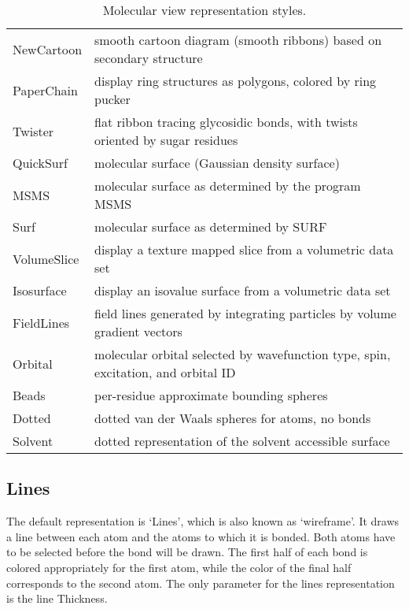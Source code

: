 \begin{table}[htb]
\begin{tabular}{|l|l|}
  NewCartoon	& smooth cartoon diagram (smooth ribbons) based on secondary structure \\
  PaperChain    & display ring structures as polygons, colored by ring pucker \\
  Twister       & flat ribbon tracing glycosidic bonds, with twists oriented by sugar residues \\
  QuickSurf     & molecular surface (Gaussian density surface) \\
  MSMS		& molecular surface as determined by the program MSMS \\
  Surf		& molecular surface as determined by SURF \\
  VolumeSlice   & display a texture mapped slice from a volumetric data set \\
  Isosurface    & display an isovalue surface from a volumetric data set \\
  FieldLines    & field lines generated by integrating particles by volume gradient vectors \\
  Orbital       & molecular orbital selected by wavefunction type, spin, excitation, and orbital ID \\
  Beads         & per-residue approximate bounding spheres \\
  Dotted	& dotted van der Waals spheres for atoms, no bonds \\
  Solvent       & dotted representation of the solvent accessible surface \\
  \hline
  \end{tabular}
  \caption{Molecular view representation styles.}
  \label{table:ug:drawmethods}
\end{table}


\subsection{Lines}
\label{ug:topic:drawmethods:lines}
The default representation is `Lines', which is also known as
`wireframe'.
It draws a line between each atom and the atoms to which
it is bonded.  Both atoms have to be selected before the bond will be
drawn.  The first half of each bond is colored appropriately for the
first atom, while the color of the final half corresponds to the
second atom.  The only parameter for the lines representation is 
the line {\sf Thickness}.  


